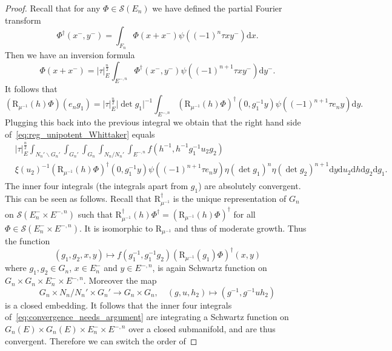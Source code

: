 \documentclass[letterpaper,11pt]{amsart}
\newcommand{\cS}{\mathcal{S}}
\newcommand{\rd}{\mathrm{d}}
\newcommand{\bs}{\backslash}
\newcommand{\<}{\negthickspace}
\providecommand{\abs}[1]{\lvert#1\rvert}
\theoremstyle{definition}
\theoremstyle{plain}
\theoremstyle{remark}
\numberwithin{equation}{section}
\begin{document}
\begin{proof}
Recall that for any $\Phi \in \cS(E_n)$ we have defined the partial Fourier
transform
    \[
    \Phi^\dag(x^-, y^-) = \int_{F_n} \Phi(x+x^-)
    \psi((-1)^{n} \tau x y^-) \rd x.
    \]
Then we have an inversion formula
    \begin{equation}    \label{eq:local_FT_inverstion_Phi}
    \Phi(x+x^-) = \abs{\tau}_E^{\frac{n}{2}}
    \int_{E^{-, n}} \Phi^\dag(x^-, y^-)
    \psi((-1)^{n+1} \tau xy^-) \rd y^-.
    \end{equation}
It follows that
    \[
    (\mathrm{R}_{\mu^{-1}}(h)\Phi)(e_n g_1) = \abs{\tau}_E^{\frac{n}{2}}
    \abs{\det g_1}^{-1}
    \int_{E^{-, n}}
    (\mathrm{R}_{\mu^{-1}}(h)\Phi)^\dag(0, g_1^{-1} y)
    \psi((-1)^{n+1} \tau e_n y) \rd y.
    \]
Plugging this back into the previous integral we obtain that the right hand
side of~\eqref{eq:reg_unipotent_Whittaker} equals
    \begin{equation}    \label{eq:convergence_needs_argument}
    \begin{aligned}
    &\abs{\tau}_E^{\frac{n}{2}}
    \int_{N_n' \bs G_n'} \int_{G_n'}
    \int_{G_n}  \int_{N_n/N_n'} \int_{E^{-, n}}
    f(h^{-1}, h^{-1} g_1^{-1} u_2 g_2) \\
    &
    \xi(u_2)^{-1} (\mathrm{R}_{\mu^{-1}}(h)\Phi)^\dag(0, g_1^{-1} y)
    \psi((-1)^{n+1} \tau e_n y)
    \eta(\det g_1)^{n} \eta(\det g_2)^{n+1}
    \rd y \rd u_2 \rd h \rd g_2 \rd g_1.
    \end{aligned}
    \end{equation}
The inner four integrals (the integrals apart from $g_1$) are absolutely
convergent. This can be seen as follows. Recall that $\mathrm{R}_{\mu^{-1}}^\dag$ is the
unique representation of $G_n$ on $\cS(E_n^- \times E^{-, n})$ such that
$\mathrm{R}_{\mu^{-1}}^\dag(h) \Phi^\dag = (\mathrm{R}_{\mu^{-1}}(h)\Phi)^\dag$ for all $\Phi
\in \cS(E_n^- \times E^{-, n})$. It is isomorphic to $\mathrm{R}_{\mu^{-1}}$ and thus
of moderate growth. Thus the function
    \[
    (g_1, g_2, x, y) \mapsto f(g_1^{-1}, g_1^{-1} g_2)
    (\mathrm{R}_{\mu^{-1}}(g_1)\Phi)^\dag(x, y)
    \]
where $g_1, g_2 \in G_n$, $x \in E_n^-$ and $y \in E^{-,n}$, is again
Schwartz function on $G_n \times G_n \times E_n^- \times E^{-,n}$. Moreover
the map
    \[
    G_n \times N_n/N_n' \times G_n' \to G_n \times G_n, \quad
    (g, u, h_2) \mapsto (g^{-1}, g^{-1}uh_2)
    \]
is a closed embedding. It follows that the inner four integrals
of~\eqref{eq:convergence_needs_argument} are integrating a Schwartz function
on $G_n(E) \times G_n(E) \times E_n^- \times E^{-,n}$ over a closed
submanifold, and are thus convergent. Therefore we can switch the order of

\end{proof}
\end{document}

